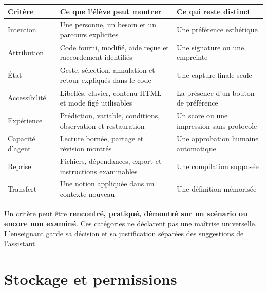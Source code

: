 \documentclass[
  canadien,
  11pt,
  a4paper,
]{report}
\newcounter{none} %
\begin{document}
{\def\LTcaptype{none} %
\begin{longtable}[]{@{}
  >{\raggedright\arraybackslash}p{}
  >{\raggedright\arraybackslash}p{}
  >{\raggedright\arraybackslash}p{}@{}}
\toprule\noalign{}
\begin{minipage}[b]{\linewidth}\raggedright
Critère
\end{minipage} & \begin{minipage}[b]{\linewidth}\raggedright
Ce que l'élève peut montrer
\end{minipage} & \begin{minipage}[b]{\linewidth}\raggedright
Ce qui reste distinct
\end{minipage} \\
\midrule\noalign{}
\endhead
\bottomrule\noalign{}
\endlastfoot
Intention & Une personne, un besoin et un parcours explicites & Une
préférence esthétique \\
Attribution & Code fourni, modifié, aide reçue et raccordement
identifiés & Une signature ou une empreinte \\
État & Geste, sélection, annulation et retour expliqués dans le code &
Une capture finale seule \\
Accessibilité & Libellés, clavier, contenu HTML et mode figé utilisables
& La présence d'un bouton de préférence \\
Expérience & Prédiction, variable, conditions, observation et
restauration & Un score ou une impression sans protocole \\
Capacité d'agent & Lecture bornée, partage et révision montrés & Une
approbation humaine automatique \\
Reprise & Fichiers, dépendances, export et instructions examinables &
Une compilation supposée \\
Transfert & Une notion appliquée dans un contexte nouveau & Une
définition mémorisée \\
\end{longtable}
}

Un critère peut être \textbf{rencontré, pratiqué, démontré sur un
scénario ou encore non examiné}. Ces catégories ne déclarent pas une
maîtrise universelle. L'enseignant garde sa décision et sa justification
séparées des suggestions de l'assistant.

\section{Stockage et permissions}\label{stockage-et-permissions}
\end{document}
